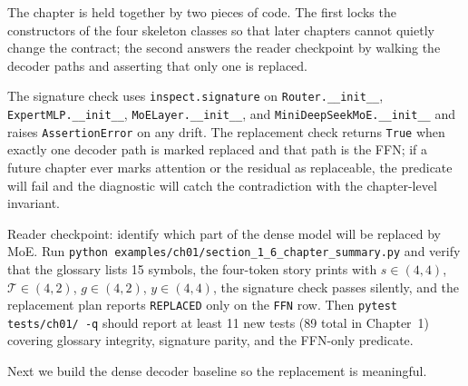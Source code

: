 The chapter is held together by two pieces of code. The first locks the constructors of the four skeleton classes so that later chapters cannot quietly change the contract; the second answers the reader checkpoint by walking the decoder paths and asserting that only one is replaced.



The signature check uses \texttt{inspect.signature} on \texttt{Router.\_\_init\_\_}, \texttt{ExpertMLP.\_\_init\_\_}, \texttt{MoELayer.\_\_init\_\_}, and \texttt{MiniDeepSeekMoE.\_\_init\_\_} and raises \texttt{AssertionError} on any drift. The replacement check returns \texttt{True} when exactly one decoder path is marked replaced and that path is the FFN; if a future chapter ever marks attention or the residual as replaceable, the predicate will fail and the diagnostic will catch the contradiction with the chapter-level invariant.

\begin{checkpointbox}
Reader checkpoint: identify which part of the dense model will be replaced by MoE. Run \texttt{python examples/ch01/section\_1\_6\_chapter\_summary.py} and verify that the glossary lists 15 symbols, the four-token story prints with $s\!\in\!(4,4)$, $\mathcal{T}\!\in\!(4,2)$, $g\!\in\!(4,2)$, $y\!\in\!(4,4)$, the signature check passes silently, and the replacement plan reports \texttt{REPLACED} only on the \texttt{FFN} row. Then \texttt{pytest tests/ch01/ -q} should report at least 11 new tests (89 total in Chapter~1) covering glossary integrity, signature parity, and the FFN-only predicate.
\end{checkpointbox}

Next we build the dense decoder baseline so the replacement is meaningful.
